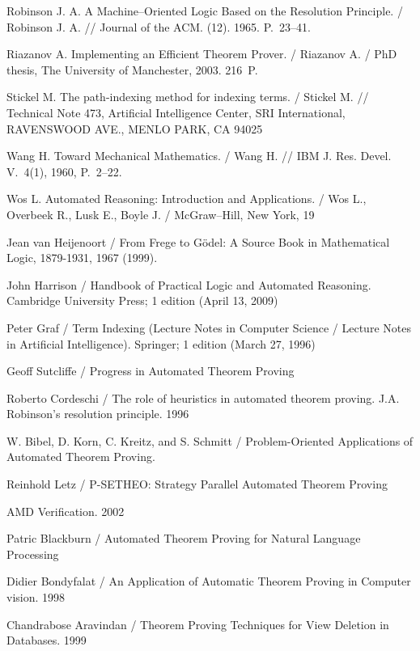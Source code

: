 \begin{thebibliography}{99}
 Robinson J. A. A Machine--Oriented Logic Based on the Resolution Principle. / Robinson J. A. //  Journal of the ACM. (12). 1965. P.~23--41.

 Riazanov A. Implementing an Efficient Theorem Prover. / Riazanov A. /  PhD thesis, The University of Manchester, 2003. 216~P.

 Stickel M. The path-indexing method for indexing terms. / Stickel M. // Technical Note 473, Artificial Intelligence Center, SRI International, RAVENSWOOD AVE., MENLO PARK, CA 94025

 Wang H. Toward Mechanical Mathematics. / Wang H. // IBM J. Res. Devel. V.~4(1), 1960, P.~2--22.

 Wos L. Automated Reasoning: Introduction and Applications. / Wos L., Overbeek R., Lusk E.,  Boyle J. / McGraw--Hill,  New York, 19

 Jean van Heijenoort / From Frege to Gödel: A Source Book in Mathematical Logic, 1879-1931, 1967 (1999).

 John Harrison / Handbook of Practical Logic and Automated Reasoning. Cambridge University Press; 1 edition (April 13, 2009)

 Peter Graf / Term Indexing (Lecture Notes in Computer Science / Lecture Notes in Artificial Intelligence). Springer; 1 edition (March 27, 1996)


 Geoff Sutcliffe / Progress in Automated Theorem Proving

 Roberto Cordeschi / The role of heuristics in automated theorem proving.
J.A. Robinson's resolution principle. 1996

 W. Bibel, D. Korn, C. Kreitz, and S. Schmitt / Problem-Oriented Applications of Automated Theorem Proving.

 Reinhold Letz / P-SETHEO: Strategy Parallel Automated Theorem Proving

 AMD Verification. 2002

 Patric Blackburn / Automated Theorem Proving for Natural Language Processing

 Didier Bondyfalat / An Application of Automatic Theorem Proving in Computer vision. 1998

 Chandrabose Aravindan / Theorem Proving Techniques for View Deletion in Databases. 1999


\end{thebibliography}
